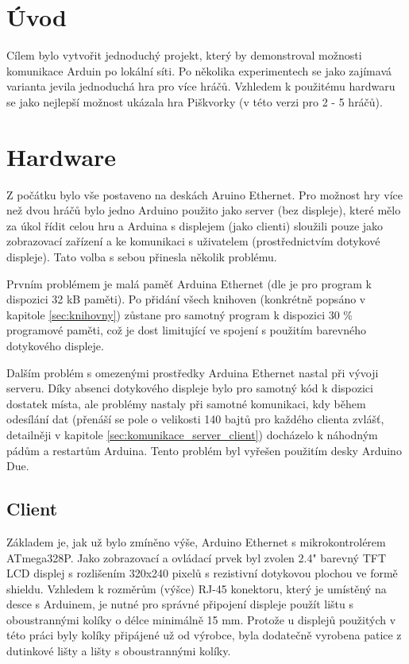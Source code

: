 \documentclass[a4paper,12pt, twoside]{article} %
\begin{document}
\section{Úvod} 
\label{sec:uvod}
Cílem bylo vytvořit jednoduchý projekt, který by demonstroval možnosti komunikace Arduin po lokální síti. Po několika experimentech se jako zajímavá varianta jevila jednoduchá hra pro více hráčů. Vzhledem k použitému hardwaru se jako nejlepší možnost ukázala hra Piškvorky (v této verzi pro 2 - 5 hráčů). 
%
\section{Hardware}
\label{sec:hardware}
Z počátku bylo vše postaveno na deskách Aruino Ethernet. Pro možnost hry více než dvou hráčů bylo jedno Arduino použito jako server (bez displeje), které mělo za úkol řídit celou hru a Arduina s displejem (jako clienti) sloužili pouze jako zobrazovací zařízení a ke komunikaci s uživatelem (prostřednictvím dotykové displeje). Tato volba s sebou přinesla několik problému. 

Prvním problémem je malá paměť Arduina Ethernet (dle \cite{arduinoEthernet_page} je pro program k dispozici 32 kB paměti). 
Po přidání všech knihoven (konkrétně popsáno v kapitole \ref{sec:knihovny}) zůstane pro samotný program k dispozici 30 \% programové paměti, což je dost limitující ve spojení s použitím barevného dotykového displeje.

Dalším problém s omezenými prostředky Arduina Ethernet nastal při vývoji serveru. Díky absenci dotykového displeje bylo pro samotný kód k dispozici dostatek místa, ale problémy nastaly při samotné komunikaci, kdy během odesílání dat (přenáší se pole o velikosti 140 bajtů pro každého clienta zvlášť, detailněji v kapitole   \ref{sec:komunikace_server_client}) docházelo k náhodným pádům a restartům Arduina. Tento problém byl vyřešen použitím desky Arduino Due.
\newpage
\subsection{Client}
\label{sec:client}
Základem je, jak už bylo zmíněno výše, Arduino Ethernet s mikrokontrolérem ATmega328P. Jako zobrazovací a ovládací prvek byl zvolen 2.4" barevný TFT LCD displej s rozlišením 320x240 pixelů s rezistivní dotykovou plochou ve formě shieldu.
Vzhledem k rozměrům (výšce) RJ-45 konektoru, který je umístěný na desce s Arduinem, je nutné pro správné připojení displeje použít lištu s oboustrannými kolíky o délce minimálně 15 mm. Protože u displejů použitých v této práci byly kolíky připájené už od výrobce, byla dodatečně vyrobena patice z dutinkové lišty a lišty s oboustrannými kolíky.
\end{document}
